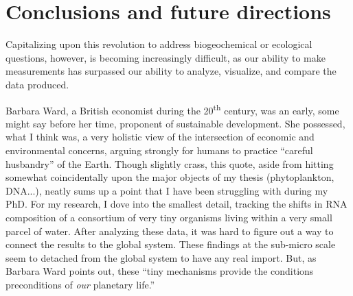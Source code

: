 \section{Conclusions and future directions}
Capitalizing upon this revolution to address biogeochemical or ecological questions, however, is becoming increasingly difficult, as our ability to make measurements has surpassed our ability to analyze, visualize, and compare the data produced.



Barbara Ward, a British economist during the 20\textsuperscript{th} century, was an early, some might say before her time, proponent of sustainable development. She possessed, what I think was, a very holistic view of the intersection of economic and environmental concerns, arguing strongly for humans to practice ``careful husbandry'' of the Earth. Though slightly crass, this quote, aside from hitting somewhat coincidentally upon the major objects of my thesis (phytoplankton, DNA...), neatly sums up a point that I have been struggling with during my PhD. For my research, I dove into the smallest detail, tracking the shifts in RNA composition of a consortium of very tiny organisms living within a very small parcel of water. After analyzing these data, it was hard to figure out a way to connect the results to the global system. These findings at the sub-micro scale seem to detached from the global system to have any real import. But, as Barbara Ward points out, these ``tiny mechanisms provide the conditions preconditions of \textit{our} planetary life.'' 
